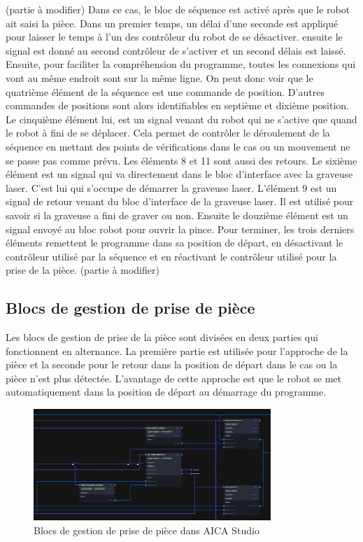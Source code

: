 (partie à modifier) Dans ce cas, le bloc de séquence est activé après que le robot ait saisi la pièce. Dans un premier temps, un délai d'une seconde est appliqué pour laisser le temps à l'un des contrôleur du robot de se désactiver. ensuite le signal est donné au second contrôleur de s'activer et un second délais est laissé. Ensuite, pour faciliter la compréhension du programme, toutes les connexions qui vont au même endroit sont sur la même ligne. On peut donc voir que le quatrième élément de la séquence est une commande de position. D'autres commandes de positions sont alors identifiables en septième et dixième position. Le cinquième élément lui, est un signal venant du robot qui ne s'active que quand le robot à fini de se déplacer. Cela permet de contrôler le déroulement de la séquence en mettant des points de vérifications dans le cas ou un mouvement ne se passe pas comme prévu. Les éléments 8 et 11 sont aussi des retours. Le sixième élément est un signal qui va directement dans le bloc d'interface avec la graveuse laser. C'est lui qui s'occupe de démarrer la graveuse laser. L'élément 9 est un signal de retour venant du bloc d'interface de la graveuse laser. Il est utilisé pour savoir si la graveuse a fini de graver ou non. Ensuite le douzième élément est un signal envoyé au bloc robot pour ouvrir la pince. Pour terminer, les trois derniers éléments remettent le programme dans sa position de départ, en désactivant le contrôleur utilisé par la séquence et en réactivant le contrôleur utilisé pour la prise de la pièce. (partie à modifier)

\subsection{Blocs de gestion de prise de pièce}

Les blocs de gestion de prise de la pièce sont divisées en deux parties qui fonctionnent en alternance. La première partie est utilisée pour l'approche de la pièce et la seconde pour le retour dans la position de départ dans le cas ou la pièce n'est plus détectée. L'avantage de cette approche est que le robot se met automatiquement dans la position de départ au démarrage du programme.

\begin{figure}[H]
    \centering
    \includegraphics[width=0.8\textwidth]{assets/figures/AICA_Prise (2).png}
    \caption{Blocs de gestion de prise de pièce dans AICA Studio}
    \label{fig:piece_block}
\end{figure}


